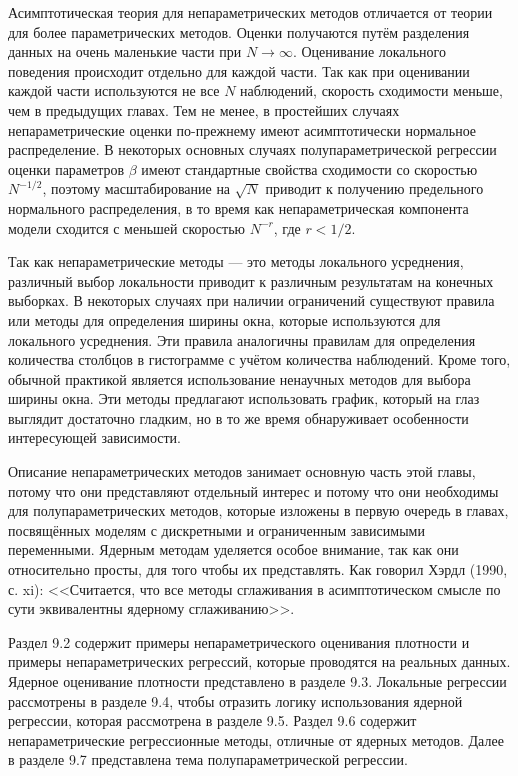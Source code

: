 Асимптотическая теория для непараметрических методов отличается от теории для более параметрических методов. Оценки получаются путём разделения данных на очень маленькие части при $N \rightarrow \infty$. Оценивание локального поведения происходит отдельно для каждой части. Так как при оценивании каждой части используются не все $N$ наблюдений, скорость сходимости меньше, чем в предыдущих главах. Тем не менее, в простейших случаях непараметрические оценки по-прежнему имеют асимптотически нормальное распределение. В некоторых основных случаях полупараметрической регрессии оценки параметров $\beta$ имеют стандартные свойства сходимости со скоростью $N^{-1/2}$, поэтому масштабирование на $\sqrt{N}$ приводит к получению предельного нормального распределения, в то время как непараметрическая компонента модели сходится с меньшей скоростью $N^{-r}$, где $r < 1/2$.

Так как непараметрические методы --- это методы локального усреднения, различный выбор локальности приводит к различным результатам на конечных выборках. В некоторых случаях при наличии ограничений существуют правила или методы для определения ширины окна, которые используются для локального усреднения. Эти правила аналогичны правилам для определения количества столбцов в гистограмме с учётом количества наблюдений. Кроме того, обычной практикой является использование ненаучных методов для выбора ширины окна. Эти методы предлагают использовать график, который на глаз выглядит достаточно гладким, но в то же время обнаруживает особенности интересующей зависимости.

Описание непараметрических методов занимает основную часть этой главы, потому что они представляют отдельный интерес и потому что они необходимы для полупараметрических методов, которые изложены в первую очередь в главах, посвящённых моделям с дискретными и ограниченным зависимыми переменными. Ядерным методам уделяется особое внимание, так как они относительно просты, для того чтобы их представлять. Как говорил Хэрдл (1990, с. xi): <<Считается, что все методы сглаживания в асимптотическом смысле по сути эквивалентны ядерному сглаживанию>>.

Раздел 9.2 содержит примеры непараметрического оценивания плотности и примеры непараметрических регрессий, которые проводятся на реальных данных. Ядерное оценивание плотности представлено в разделе 9.3. Локальные регрессии рассмотрены в разделе 9.4, чтобы отразить логику использования ядерной регрессии, которая рассмотрена в разделе 9.5. Раздел 9.6 содержит непараметрические регрессионные методы, отличные от ядерных методов. Далее в разделе 9.7 представлена тема полупараметрической регрессии.


